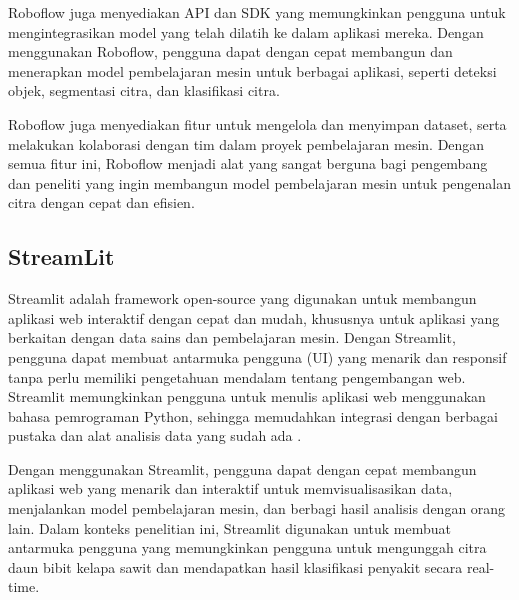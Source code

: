 Roboflow juga menyediakan API dan SDK yang memungkinkan pengguna untuk mengintegrasikan model yang telah dilatih ke dalam aplikasi mereka. Dengan menggunakan Roboflow, pengguna dapat dengan cepat membangun dan menerapkan model pembelajaran mesin untuk berbagai aplikasi, seperti deteksi objek, segmentasi citra, dan klasifikasi citra.

Roboflow juga menyediakan fitur untuk mengelola dan menyimpan dataset, serta melakukan kolaborasi dengan tim dalam proyek pembelajaran mesin. Dengan semua fitur ini, Roboflow menjadi alat yang sangat berguna bagi pengembang dan peneliti yang ingin membangun model pembelajaran mesin untuk pengenalan citra dengan cepat dan efisien.

\subsection{StreamLit} \label{II.StreamLit}
Streamlit adalah framework open-source yang digunakan untuk membangun aplikasi web interaktif dengan cepat dan mudah, khususnya untuk aplikasi yang berkaitan dengan data sains dan pembelajaran mesin. Dengan Streamlit, pengguna dapat membuat antarmuka pengguna (UI) yang menarik dan responsif tanpa perlu memiliki pengetahuan mendalam tentang pengembangan web.
Streamlit memungkinkan pengguna untuk menulis aplikasi web menggunakan bahasa pemrograman Python, sehingga memudahkan integrasi dengan berbagai pustaka dan alat analisis data yang sudah ada \cite{wahyuni2024transformasi}.

Dengan menggunakan Streamlit, pengguna dapat dengan cepat membangun aplikasi web yang menarik dan interaktif untuk memvisualisasikan data, menjalankan model pembelajaran mesin, dan berbagi hasil analisis dengan orang lain. Dalam konteks penelitian ini, Streamlit digunakan untuk membuat antarmuka pengguna yang memungkinkan pengguna untuk mengunggah citra daun bibit kelapa sawit dan mendapatkan hasil klasifikasi penyakit secara real-time.
